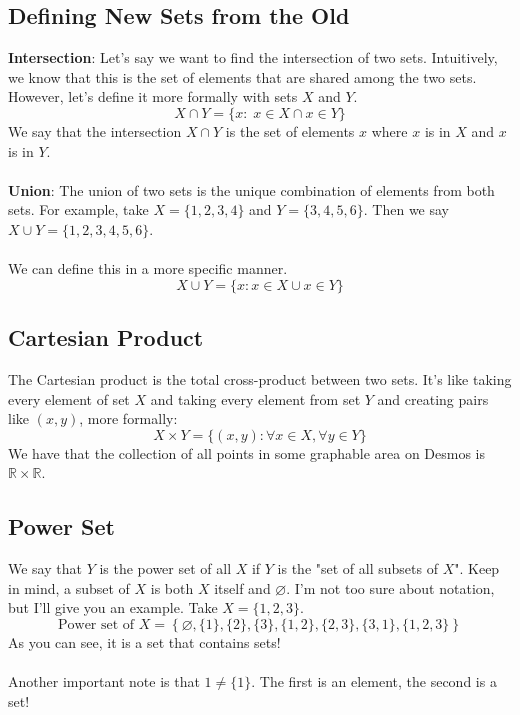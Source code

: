 \subsection{Defining New Sets from the Old}

\textbf{Intersection}: Let's say we want to find the intersection of two sets. Intuitively, we know that this is the set of elements that are shared among the two sets. However, let's define it more formally with sets $X$ and $Y$. 
$$
X \cap Y = \{x :\; x \in X \cap x \in Y\}
$$
We say that the intersection $X \cap Y$ is the set of elements $x$ where $x$ is in $X$ and $x$ is in $Y$. \\
\\
\textbf{Union}: The union of two sets is the unique combination of elements from both sets. For example, take $X = \{1,2,3,4\}$ and $Y = \{3,4,5,6\}$. Then we say $X \cup Y = \{1,2,3,4,5,6\}$. \\
\\
We can define this in a more specific manner.
$$
X \cup Y = \{x : x \in X \cup x \in Y \}
$$

\subsection{Cartesian Product}
The Cartesian product is the total cross-product between two sets. It's like taking every element of set $X$ and taking every element from set $Y$ and creating pairs like $(x,y)$, more formally:
$$
X \times Y = \{(x,y) : \forall x \in X, \forall y \in Y\}
$$
We have that the collection of all points in some graphable area on Desmos is $\mathbb{R} \times \mathbb{R}$. 

\subsection{Power Set}
We say that $Y$ is the power set of all $X$ if $Y$ is the "set of all subsets of $X$". Keep in mind, a subset of $X$ is both $X$ itself and $\varnothing$. I'm not too sure about notation, but I'll give you an example. Take $X = \{1,2,3\}$. 
$$
\text{Power set of }X = \left\{\varnothing, \{1\}, \{2\}, \{3\}, \{1,2\}, \{2,3\}, \{3,1\}, \{1,2,3\}\right\}
$$
As you can see, it is a set that contains sets!\\
\\
Another important note is that $1 \neq \{1\}$. The first is an element, the second is a set! 